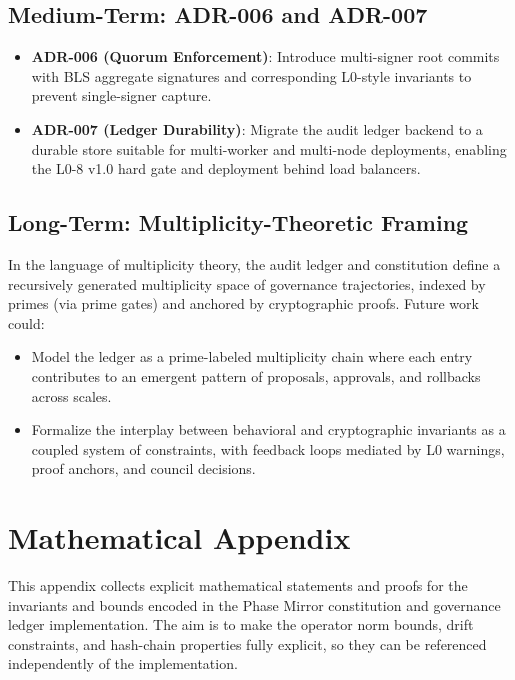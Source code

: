 \documentclass[11pt]{article}
\begin{document}
\subsection{Medium-Term: ADR-006 and ADR-007}

\begin{itemize}[nosep]
  \item \textbf{ADR-006 (Quorum Enforcement)}: Introduce multi-signer root commits with BLS aggregate signatures and corresponding L0-style invariants to prevent single-signer capture.
  \item \textbf{ADR-007 (Ledger Durability)}: Migrate the audit ledger backend to a durable store suitable for multi-worker and multi-node deployments, enabling the L0-8 v1.0 hard gate and deployment behind load balancers.\cite{cite:44,cite:46,cite:47}
\end{itemize}

\subsection{Long-Term: Multiplicity-Theoretic Framing}

In the language of multiplicity theory, the audit ledger and constitution define a recursively generated multiplicity space of governance trajectories, indexed by primes (via prime gates) and anchored by cryptographic proofs. Future work could:
\begin{itemize}[nosep]
  \item Model the ledger as a prime-labeled multiplicity chain where each entry contributes to an emergent pattern of proposals, approvals, and rollbacks across scales.
  \item Formalize the interplay between behavioral and cryptographic invariants as a coupled system of constraints, with feedback loops mediated by L0 warnings, proof anchors, and council decisions.
\end{itemize}

\appendix
\section*{Mathematical Appendix}

This appendix collects explicit mathematical statements and proofs for the invariants and bounds encoded in the Phase Mirror constitution and governance ledger implementation.\cite{cite:40,cite:41,cite:42,cite:43,cite:44,cite:46,cite:47} 
The aim is to make the operator norm bounds, drift constraints, and hash-chain properties fully explicit, so they can be referenced independently of the implementation.
\end{document}
